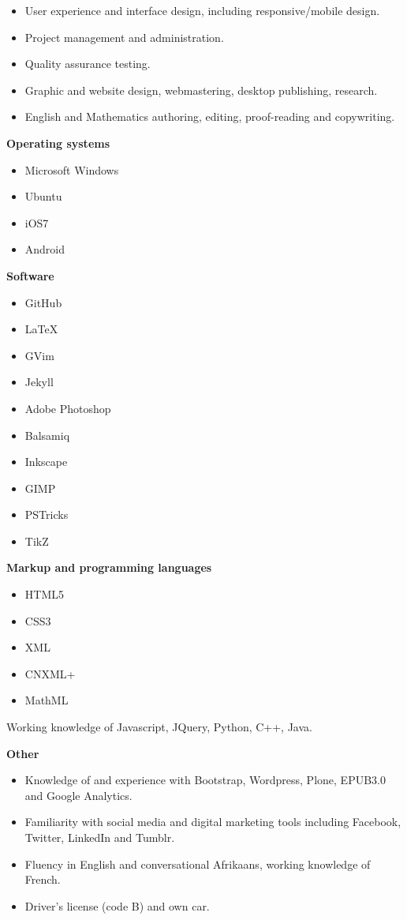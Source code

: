 \documentclass[]{friggeri-cv} %
\begin{document}
\begin{itemize}
\item User experience and interface design, including responsive/mobile design.
\item Project management and administration.
\item Quality assurance testing.
\item Graphic and website design, webmastering, desktop publishing, research.
\item English and Mathematics authoring, editing, proof-reading and copywriting.

\end{itemize}

\textbf{Operating systems}
\begin{multicols}{2}
\begin{itemize}
 \item Microsoft Windows
 \item Ubuntu
 \item iOS7
 \item Android
\end{itemize}
\end{multicols}

\textbf{Software}
\begin{multicols}{2}
\begin{itemize}
 \item GitHub
 \item LaTeX
 \item GVim
 \item Jekyll
  \item Adobe Photoshop
 \item Balsamiq
 \item Inkscape
 \item GIMP
 \item PSTricks
 \item TikZ
\end{itemize}
\end{multicols}

\textbf{Markup and programming languages}
\begin{itemize}
 \item HTML5
 \item CSS3
 \item XML
 \item CNXML+
 \item MathML
 \end{itemize}
Working knowledge of Javascript, JQuery, Python, C++, Java.

\textbf{Other}
\begin{itemize}
\item Knowledge of and experience with Bootstrap, Wordpress, Plone, EPUB3.0 and Google Analytics.
 \item Familiarity with social media and digital marketing tools including Facebook, Twitter, LinkedIn and Tumblr.
 \item Fluency in English and conversational Afrikaans, working knowledge of French.
 \item Driver's license (code B) and own car.
\end{itemize}
\end{document}

